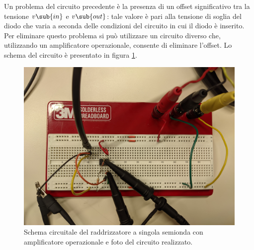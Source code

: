 Un problema del circuito precedente è la presenza di un offset significativo tra la tensione $v\sub{in}$ e $v\sub{out}$: tale valore è pari alla tensione di soglia del diodo che varia a seconda delle condizioni del circuito in cui il diodo è inserito. Per eliminare questo problema si può utilizzare un circuito diverso che, utilizzando un amplificatore operazionale, consente di eliminare l'offset. Lo schema del circuito è presentato in figura \ref{fig:circuito_2}.
\begin{figure}[h]
	\centering
	\begin{minipage}{.45\textwidth}
	\end{minipage}\qquad
	\begin{minipage}{.48\textwidth}
		\includegraphics[width=\linewidth]{./ImageFiles/Laboratorio 2/CIR2.jpg}
	\end{minipage}
	\caption{Schema circuitale del raddrizzatore a singola semionda con amplificatore operazionale e foto del circuito realizzato.}
	\label{fig:circuito_2}
\end{figure}

